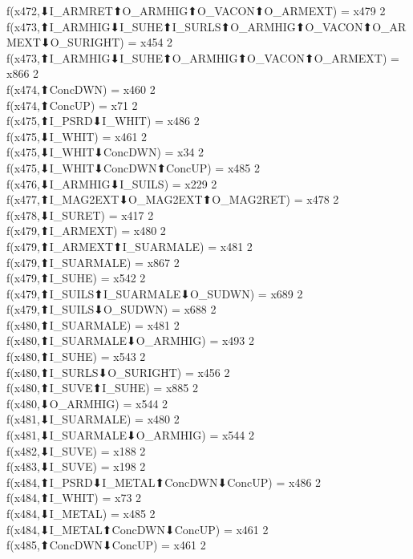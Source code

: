 f(x472,⬇I_ARMRET⬆O_ARMHIG⬆O_VACON⬆O_ARMEXT) = x479 {2} \\
f(x473,⬆I_ARMHIG⬇I_SUHE⬆I_SURLS⬆O_ARMHIG⬆O_VACON⬆O_ARMEXT⬇O_SURIGHT) = x454 {2} \\
f(x473,⬆I_ARMHIG⬇I_SUHE⬆O_ARMHIG⬆O_VACON⬆O_ARMEXT) = x866 {2} \\
f(x474,⬆ConcDWN) = x460 {2} \\
f(x474,⬆ConcUP) = x71 {2} \\
f(x475,⬆I_PSRD⬇I_WHIT) = x486 {2} \\
f(x475,⬇I_WHIT) = x461 {2} \\
f(x475,⬇I_WHIT⬇ConcDWN) = x34 {2} \\
f(x475,⬇I_WHIT⬇ConcDWN⬆ConcUP) = x485 {2} \\
f(x476,⬇I_ARMHIG⬇I_SUILS) = x229 {2} \\
f(x477,⬆I_MAG2EXT⬇O_MAG2EXT⬆O_MAG2RET) = x478 {2} \\
f(x478,⬇I_SURET) = x417 {2} \\
f(x479,⬆I_ARMEXT) = x480 {2} \\
f(x479,⬆I_ARMEXT⬆I_SUARMALE) = x481 {2} \\
f(x479,⬆I_SUARMALE) = x867 {2} \\
f(x479,⬆I_SUHE) = x542 {2} \\
f(x479,⬆I_SUILS⬆I_SUARMALE⬇O_SUDWN) = x689 {2} \\
f(x479,⬆I_SUILS⬇O_SUDWN) = x688 {2} \\
f(x480,⬆I_SUARMALE) = x481 {2} \\
f(x480,⬆I_SUARMALE⬇O_ARMHIG) = x493 {2} \\
f(x480,⬆I_SUHE) = x543 {2} \\
f(x480,⬆I_SURLS⬇O_SURIGHT) = x456 {2} \\
f(x480,⬆I_SUVE⬆I_SUHE) = x885 {2} \\
f(x480,⬇O_ARMHIG) = x544 {2} \\
f(x481,⬇I_SUARMALE) = x480 {2} \\
f(x481,⬇I_SUARMALE⬇O_ARMHIG) = x544 {2} \\
f(x482,⬇I_SUVE) = x188 {2} \\
f(x483,⬇I_SUVE) = x198 {2} \\
f(x484,⬆I_PSRD⬇I_METAL⬆ConcDWN⬇ConcUP) = x486 {2} \\
f(x484,⬆I_WHIT) = x73 {2} \\
f(x484,⬇I_METAL) = x485 {2} \\
f(x484,⬇I_METAL⬆ConcDWN⬇ConcUP) = x461 {2} \\
f(x485,⬆ConcDWN⬇ConcUP) = x461 {2} \\
